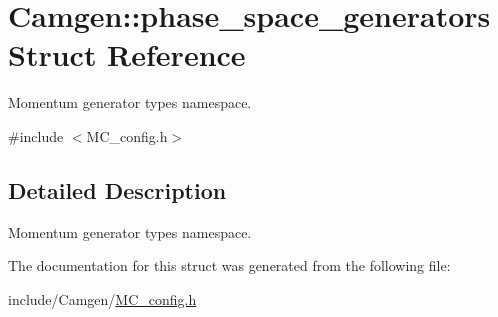 \hypertarget{a00417}{\section{Camgen\-:\-:phase\-\_\-space\-\_\-generators Struct Reference}
\label{a00417}
}


Momentum generator types namespace.  




{\ttfamily \#include $<$M\-C\-\_\-config.\-h$>$}



\subsection{Detailed Description}
Momentum generator types namespace. 

The documentation for this struct was generated from the following file\-:\begin{DoxyCompactItemize}
\item 
include/\-Camgen/\hyperlink{a00670}{M\-C\-\_\-config.\-h}\end{DoxyCompactItemize}
